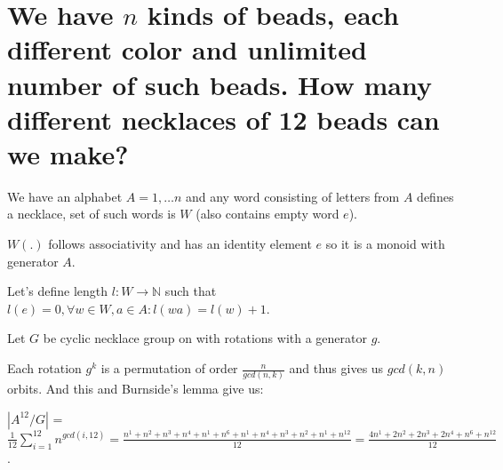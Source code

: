 \documentclass[11pt]{article}
\begin{document}
    \part*{We have $n$ kinds of beads, each different color and unlimited number of such beads. How many different necklaces of 12 beads can we make?}

    We have an alphabet $A = {1, \dots n}$ and any word consisting of letters from $A$ defines a necklace, set of such words is $W$ (also contains empty word $e$).

    $W(.)$ follows associativity and has an identity element $e$ so it is a monoid with generator $A$.

    Let's define length $l: W \rightarrow \mathbb{N}$ such that $l(e) = 0, \forall w \in W, a \in A: l(wa) = l(w) + 1$.

    Let $G$ be cyclic necklace group on with rotations with a generator $g$.

    Each rotation $g^k$ is a permutation of order $\frac{n}{gcd(n,k)}$ and thus gives us $gcd(k,n)$ orbits. And this and Burnside's lemma give us:

    $|A^{12} / G|$ = $\frac{1}{12} \sum\limits_{i=1}^{12} n^{gcd(i,12)} = \frac{n^1+n^2+n^3+n^4+n^1+n^6+n^1+n^4+n^3+n^2+n^1+n^{12}}{12} = \frac{4n^1+2n^2+2n^3+2n^4+n^6+n^{12}}{12}$.
\end{document}
